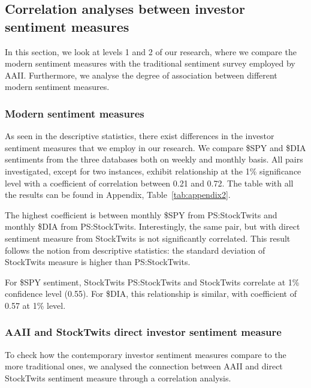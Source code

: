\newpage

\subsection{Correlation analyses between investor sentiment measures} \label{correlation-sentiments}
In this section, we look at levels 1 and 2 of our research, where we compare the modern sentiment measures with the traditional sentiment survey employed by AAII. Furthermore, we analyse the degree of association between different modern sentiment measures.

\subsubsection{Modern sentiment measures}
As seen in the descriptive statistics, there exist differences in the investor sentiment measures that we employ in our research. We compare \$SPY and \$DIA sentiments from the three databases both on weekly and monthly basis. All pairs investigated, except for two instances, exhibit relationship at the 1\% significance level with a coefficient of correlation between 0.21 and 0.72. The table with all the results can be found in Appendix, Table~\ref{tab:appendix2}.
\par
The highest coefficient is between monthly \$SPY from PS:StockTwits and monthly \$DIA from PS:StockTwits. Interestingly, the same pair, but with direct sentiment measure from StockTwits is not significantly correlated. This result follows the notion from descriptive statistics: the standard deviation of StockTwits measure is higher than PS:StockTwits.
\par
For \$SPY sentiment, StockTwits PS:StockTwits and StockTwits correlate at 1\% confidence level (0.55). For \$DIA, this relationship is similar, with coefficient of 0.57 at 1\% level.

\subsubsection{AAII and StockTwits direct investor sentiment measure}
To check how the contemporary investor sentiment measures compare to the more traditional ones, we analysed the connection between AAII and direct StockTwits sentiment measure through a correlation analysis.

